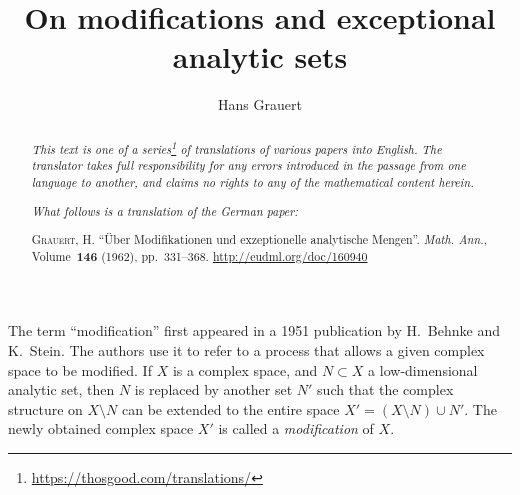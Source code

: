 \documentclass{article}
\title{On modifications and exceptional analytic sets}
\author{Hans Grauert}
\date{}
\theoremstyle{plain}
\theoremstyle{definition}
\newcommand{\oldpage}[1]{\marginpar{\phantom{.}\\\footnotesize$\Big\vert$ \textit{p.~#1}}}
\begin{document}
\maketitle
\thispagestyle{fancy}

\renewcommand{\abstractname}{Translator's note.}

\begin{abstract}
  \renewcommand*{\thefootnote}{\fnsymbol{footnote}}
  \emph{This text is one of a series\footnote{\url{https://thosgood.com/translations/}} of translations of various papers into English.}
  \emph{The translator takes full responsibility for any errors introduced in the passage from one language to another, and claims no rights to any of the mathematical content herein.}
  
  \emph{What follows is a translation of the German paper:}

  \medskip\noindent
  \textsc{Grauert, H.}
  ``\"{U}ber Modifikationen und exzeptionelle analytische Mengen''.
  \emph{Math. Ann.}, Volume~\textbf{146} (1962), pp.~331--368.
  {\footnotesize\url{http://eudml.org/doc/160940}}
\end{abstract}

\setcounter{footnote}{0}

\tableofcontents



\section*{}

\oldpage{331}
The term ``modification'' first appeared in a 1951 publication \cite{1} by H.~Behnke and K.~Stein.
The authors use it to refer to a process that allows a given complex space to be modified.
If $X$ is a complex space, and $N\subset X$ a low-dimensional analytic set, then $N$ is replaced by another set $N'$ such that the complex structure on $X\setminus N$ can be extended to the entire space $X'=(X\setminus N)\cup N'$.
The newly obtained complex space $X'$ is called a \emph{modification} of $X$.



\nocite{*}

\end{document}
